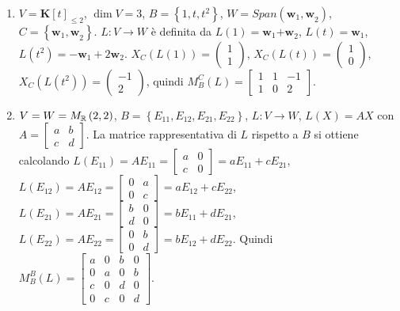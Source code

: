 \documentclass{article}
\begin{document}
\begin{enumerate}
\item $V=\mathbf{K}\left[ t\right] _{\leq 2}$, $\dim V=3$, $B=\left\{
1,t,t^{2}\right\} $, $W=Span\left( \mathbf{w}_{1}\mathbf{,w}_{2}\right) $, $%
C=\left\{ \mathbf{w}_{1}\mathbf{,w}_{2}\right\} $. $L:V\rightarrow W$ \`{e}
definita da $L\left( 1\right) =\mathbf{w}_{1}\mathbf{+w}_{2}$, $L\left(
t\right) =\mathbf{w}_{1}$, $L\left( t^{2}\right) =-\mathbf{w}_{1}+2\mathbf{w}%
_{2}$. $X_{C}\left( L\left( 1\right) \right) =\left( 
\begin{array}{c}
1 \\ 
1%
\end{array}%
\right) $, $X_{C}\left( L\left( t\right) \right) =\left( 
\begin{array}{c}
1 \\ 
0%
\end{array}%
\right) $, $X_{C}\left( L\left( t^{2}\right) \right) =\left( 
\begin{array}{c}
-1 \\ 
2%
\end{array}%
\right) $, quindi $M_{B}^{C}\left( L\right) =\left[ 
\begin{array}{ccc}
1 & 1 & -1 \\ 
1 & 0 & 2%
\end{array}%
\right] $.

\item $V=W=M_{%
\mathbb{R}
}\left( 2,2\right) $, $B=\left\{ E_{11},E_{12},E_{21},E_{22}\right\} $, $%
L:V\rightarrow W$, $L\left( X\right) =AX$ con $A=\left[ 
\begin{array}{cc}
a & b \\ 
c & d%
\end{array}%
\right] $. La matrice rappresentativa di $L$ rispetto a $B$ si ottiene
calcolando $L\left( E_{11}\right) =AE_{11}=\left[ 
\begin{array}{cc}
a & 0 \\ 
c & 0%
\end{array}%
\right] =aE_{11}+cE_{21}$, $L\left( E_{12}\right) =AE_{12}=\left[ 
\begin{array}{cc}
0 & a \\ 
0 & c%
\end{array}%
\right] =aE_{12}+cE_{22}$, $L\left( E_{21}\right) =AE_{21}=\left[ 
\begin{array}{cc}
b & 0 \\ 
d & 0%
\end{array}%
\right] =bE_{11}+dE_{21}$, $L\left( E_{22}\right) =AE_{22}=\left[ 
\begin{array}{cc}
0 & b \\ 
0 & d%
\end{array}%
\right] =bE_{12}+dE_{22}$. Quindi $M_{B}^{B}\left( L\right) =\left[ 
\begin{array}{cccc}
a & 0 & b & 0 \\ 
0 & a & 0 & b \\ 
c & 0 & d & 0 \\ 
0 & c & 0 & d%
\end{array}%
\right] $.
\end{enumerate}
\end{document}
